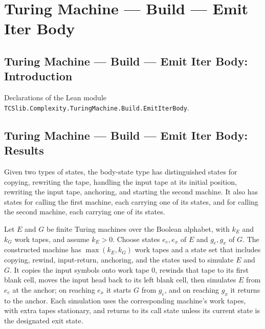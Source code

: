 \section{Turing Machine --- Build --- Emit Iter Body}
\subsection*{Turing Machine --- Build --- Emit Iter Body: Introduction}

Declarations of the Lean module \texttt{TCSlib.Complexity.TuringMachine.Build.EmitIterBody}.

\subsection*{Turing Machine --- Build --- Emit Iter Body: Results}

\begin{definition}
\label{Turing.BodyState}
\leanok
Given two types of states, the body-state type has distinguished states for copying,
rewriting the tape, handling the input tape at its initial position, rewriting the input
tape, anchoring, and starting the second machine. It also has states for calling the
first machine, each carrying one of its states, and for calling the second machine, each
carrying one of its states.
\end{definition}

\begin{definition}
\label{Turing.emitIterBody}
\leanok
{}
Let $E$ and $G$ be finite Turing machines over the Boolean alphabet, with $k_E$ and
$k_G$ work tapes, and assume $k_E>0$. Choose states $e_e,e_x$ of $E$ and $g_e,g_x$ of
$G$. The constructed machine has $\max(k_E,k_G)$ work tapes and a state set that
includes copying, rewind, input-return, anchoring, and the states used to simulate $E$
and $G$. It copies the input symbols onto work tape $0$, rewinds that tape to its first
blank cell, moves the input head back to its left blank cell, then simulates $E$ from
$e_e$ at the anchor; on reaching $e_x$ it starts $G$ from $g_e$, and on reaching $g_x$
it returns to the anchor. Each simulation uses the corresponding machine's work tapes,
with extra tapes stationary, and returns to its call state unless its current state is
the designated exit state.
\end{definition}


